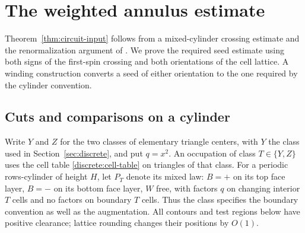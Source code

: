 \section{The weighted annulus estimate}\label{sec:annulus}

Theorem~\ref{thm:circuit-input} follows from a mixed-cylinder crossing
estimate and the renormalization argument of \cite[Appendix~A]{GL2025}.
We prove the required seed estimate using both signs of the first-spin
crossing and both orientations of the cell lattice.  A winding
construction converts a seed of either orientation to the one required
by the cylinder convention.

\subsection{Cuts and comparisons on a cylinder}

Write $Y$ and $Z$ for the two classes of elementary triangle centers,
with $Y$ the class used in Section~\ref{sec:discrete}, and put $q=x^2$.
An occupation of class $T\in\{Y,Z\}$ uses the cell table
\eqref{discrete:cell-table} on triangles of that class.
For a periodic rows-cylinder of height $H$, let $P_T$ denote its mixed
law: $B=+$ on its top face layer, $B=-$ on its bottom face layer,
$W$ free, with factors $q$ on changing interior $T$ cells and no factors
on boundary $T$ cells. Thus the class specifies the boundary convention
as well as the augmentation. All contours and test regions below have
positive clearance; lattice rounding changes their positions by $O(1)$.

